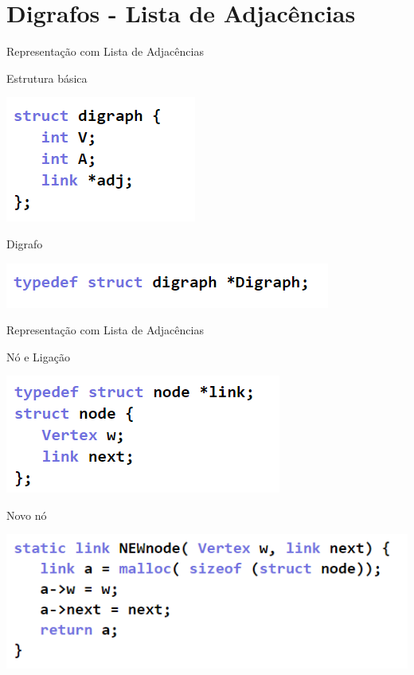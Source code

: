 \documentclass[xcolor=dvipsnames,table]{beamer}
\begin{document}
	\section{Digrafos - Lista de Adjacências}
	\begin{frame}{Representação com Lista de Adjacências}
		\begin{block}{Estrutura básica}
			\begin{center}
	    		\includegraphics[height=.25\textheight]{images/lista/digraph.png}
	  		\end{center}
		\end{block} \pause
		\begin{block}{Digrafo}
			\begin{center}
	    		\includegraphics[height=.1\textheight]{images/lista/digraph-ponteiro.png}
	  		\end{center}
		\end{block}
	\end{frame}
	
	\begin{frame}{Representação com Lista de Adjacências}
		\begin{block}{Nó e Ligação}
			\begin{center}
	    		\includegraphics[height=.3\textheight]{images/lista/node.png}
	  		\end{center}
		\end{block} \pause
		\begin{block}{Novo nó}
			\begin{center}
	    		\includegraphics[height=.3\textheight]{images/lista/new-node.png}
	  		\end{center}
		\end{block}
	\end{frame}
	
\end{document}
